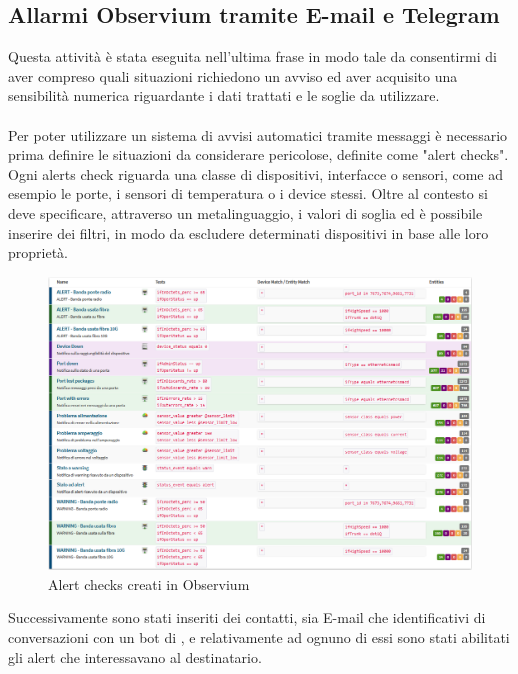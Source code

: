 \documentclass[Realizzazione.tex]{subfiles}
\begin{document}
\subsection{Allarmi Observium tramite E-mail e Telegram}
Questa attività è stata eseguita nell'ultima frase in modo tale da consentirmi di aver compreso quali situazioni richiedono un avviso ed aver acquisito una sensibilità numerica riguardante i dati trattati e le soglie da utilizzare. \\\\
Per poter utilizzare un sistema di avvisi automatici tramite messaggi è necessario prima definire le situazioni da considerare pericolose, definite come "alert checks". \\
Ogni alerts check riguarda una classe di dispositivi, interfacce o sensori, come ad esempio le porte, i sensori di temperatura o i device stessi. Oltre al contesto si deve specificare, attraverso un metalinguaggio, i valori di soglia ed è possibile inserire dei filtri, in modo da escludere determinati dispositivi in base alle loro proprietà.

\begin{figure}[H]
	\centering
	\includegraphics[width=1.1\linewidth]{"images/alerts"}
	\caption{Alert checks creati in Observium}
	\label{fig:Alerts creati in Observium}
\end{figure}

\newpage
Successivamente sono stati inseriti dei contatti, sia E-mail che identificativi di conversazioni con un bot di , e relativamente ad ognuno di essi sono stati abilitati gli alert che interessavano al destinatario.
\end{document}
